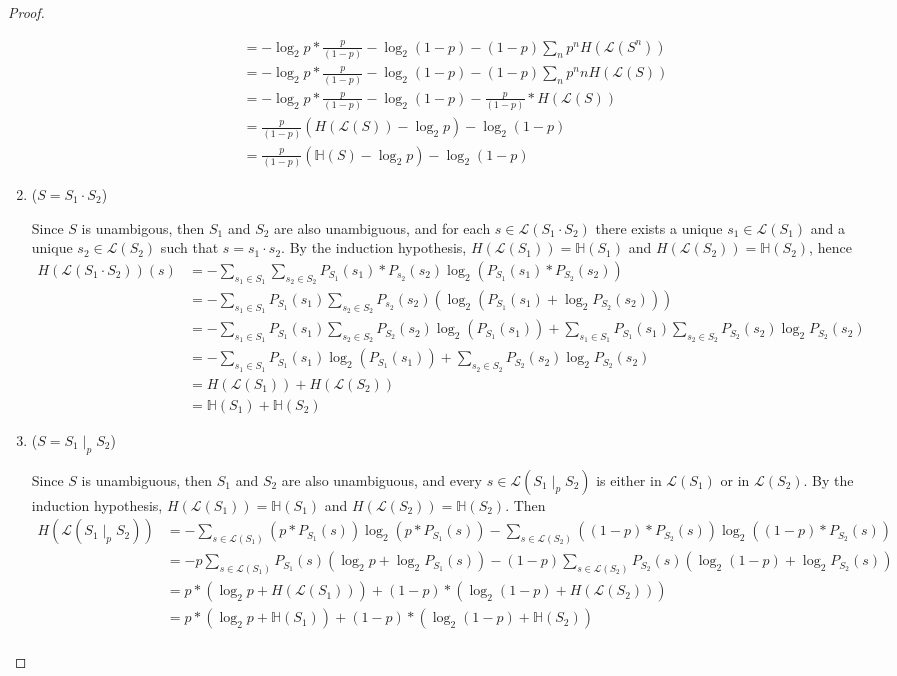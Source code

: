 \documentclass[acmsmall,screen,anonymous]{acmart}
\begin{document}
\begin{proof}
\begin{enumerate}
\begin{align*}
&= -\log_2 p * \frac{p}{(1-p)} -\log_2 (1 - p) 
-(1-p)\sum_n p^n H(\mathcal{L}(S^n))\\
&= -\log_2 p * \frac{p}{(1-p)} -\log_2 (1 - p) 
-(1-p)\sum_n p^n n H(\mathcal{L}(S))\\
&= -\log_2 p * \frac{p}{(1-p)} -\log_2 (1 - p) 
-\frac{p}{(1-p)} * H(\mathcal{L}(S))\\
&= \frac{p}{(1-p)}(H(\mathcal{L}(S)) - \log_2 p) -\log_2 (1 - p)\\
&= \frac{p}{(1-p)}(\mathbb{H}(S) - \log_2 p) -\log_2 (1 - p)
\end{align*}
\item
($S = S_1 \cdot S_2$)

Since $S$ is unambigous, then $S_1$ and $S_2$ are also unambiguous, and for each $s \in \mathcal{L}(S_1 \cdot S_2)$ there exists a unique $s_1 \in \mathcal{L}(S_1)$ and a unique $s_2 \in \mathcal{L}(S_2)$ such that $s = s_1 \cdot s_2$. By the induction hypothesis, $H(\mathcal{L}(S_1)) = \mathbb{H}(S_1)$ and $H(\mathcal{L}(S_2)) = \mathbb{H}(S_2)$, hence
\begin{align*}
H(\mathcal{L}(S_1 \cdot S_2))(s) &= -\sum_{s_1 \in S_1} \sum_{s_2 \in S_2}P_{S_1}(s_1)*P_{s_2}(s_2) \log_2(P_{S_1}(s_1)*P_{S_2}(s_2))\\
&= -\sum_{s_1 \in S_1} P_{S_1}(s_1)\sum_{s_2 \in S_2}P_{s_2}(s_2) (\log_2(P_{S_1}(s_1) + \log_2 P_{S_2}(s_2)))\\
&= -\sum_{s_1 \in S_1} P_{S_1}(s_1) \sum_{s_2 \in S_2}P_{S_2}(s_2)\log_2(P_{S_1}(s_1)) + \sum_{s_1 \in S_1} P_{S_1}(s_1)\sum_{s_2 \in S_2} P_{S_2}(s_2)\log_2 P_{S_2}(s_2)\\
&= -\sum_{s_1 \in S_1} P_{S_1}(s_1) \log_2(P_{S_1}(s_1)) + \sum_{s_2 \in S_2} P_{S_2}(s_2)\log_2 P_{S_2}(s_2)\\
&= H(\mathcal{L}(S_1)) + H(\mathcal{L}(S_2))\\
&= \mathbb{H}(S_1) + \mathbb{H}(S_2)
\end{align*}
\item
($S = S_1 \; |_p \; S_2$)

Since $S$ is unambiguous, then $S_1$ and $S_2$ are also unambiguous, and every $s \in \mathcal{L}(S_1 \; |_p \; S_2)$ is either in $\mathcal{L}(S_1)$ or in $\mathcal{L}(S_2)$. By the induction hypothesis, $H(\mathcal{L}(S_1)) = \mathbb{H}(S_1)$ and $H(\mathcal{L}(S_2)) = \mathbb{H}(S_2)$. Then
\begin{align*}
H(\mathcal{L}(S_1 \; |_p \; S_2)) &= -\sum_{s \in \mathcal{L}(S_1)}(p * P_{S_1}(s))\log_2 (p * P_{S_1}(s)) - \sum_{s \in \mathcal{L}(S_2)}((1-p) * P_{S_2}(s))\log_2 ((1-p) * P_{S_2}(s))\\
&=- p\sum_{s \in \mathcal{L}(S_1)}P_{S_1}(s)(\log_2 p + \log_2 P_{S_1}(s)) - (1-p)\sum_{s \in \mathcal{L}(S_2)}P_{S_2}(s)(\log_2 (1-p) + \log_2 P_{S_2}(s))\\
&= p * (\log_2 p +  H(\mathcal{L}(S_1))) + (1-p) * ( \log_2 (1-p) + H(\mathcal{L}(S_2)))\\
&= p * (\log_2 p +  \mathbb{H}(S_1)) + (1-p) * ( \log_2 (1-p) + \mathbb{H}(S_2))\\
\end{align*}
\end{enumerate}
\end{proof}
\end{document}
